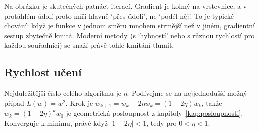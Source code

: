 Na obrázku je skutečných patnáct iterací. Gradient je kolmý na vrstevnice, a v protáhlém údolí proto míří hlavně `přes údolí', ne `podél něj'. To je typické chování: když je funkce v jednom směru mnohem strmější než v jiném, gradientní sestup zbytečně kmitá. Moderní metody (s `hybností' nebo s různou rychlostí pro každou souřadnici) se snaží právě tohle kmitání tlumit.

\subsection{Rychlost učení}

Nejdůležitější číslo celého algoritmu je $\eta$. Podívejme se na nejjednodušší možný případ $L(w) = w^2$. Krok je $w_{k+1} = w_k - 2\eta w_k = (1 - 2\eta)w_k$, takže $w_k = {(1 - 2\eta)}^kw_0$ je geometrická posloupnost z kapitoly~\ref{kap:posloupnosti}. Konverguje k minimu, právě když $|1 - 2\eta| < 1$, tedy pro $0 < \eta < 1$.

